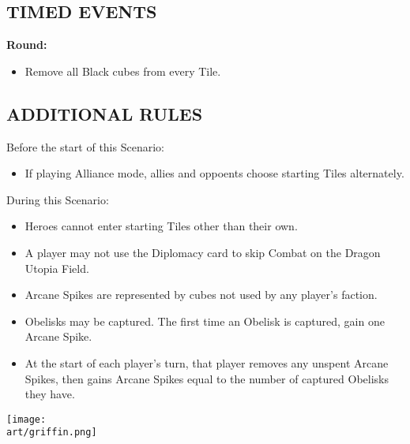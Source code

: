 \begin{multicols}{2}
\subsection*{\MakeUppercase{Timed Events}}

\textbf{ Round:}
\begin{itemize}
  \item Remove all Black cubes from every Tile.
\end{itemize}

\subsection*{\MakeUppercase{Additional Rules}}

Before the start of this Scenario:

\begin{itemize}
  \item If playing Alliance mode, allies and oppoents choose starting Tiles alternately.
\end{itemize}

During this Scenario:

\begin{itemize}
  \item Heroes cannot enter starting Tiles other than their own.
  \item A player may not use the Diplomacy card to skip Combat on the Dragon Utopia Field.
  \item Arcane Spikes are represented by cubes not used by any player's faction.
\end{itemize}

\vspace*{\fill}

\columnbreak

\begin{itemize}
    \item Obelisks may be captured. The first time an Obelisk is captured, gain one Arcane Spike.
    \item At the start of each player's turn, that player removes any unspent Arcane Spikes, then gains Arcane Spikes equal to the number of captured Obelisks they have.
\end{itemize}

\vspace{1em}

\texttt{[image: \\art/griffin.png]}

\end{multicols}

